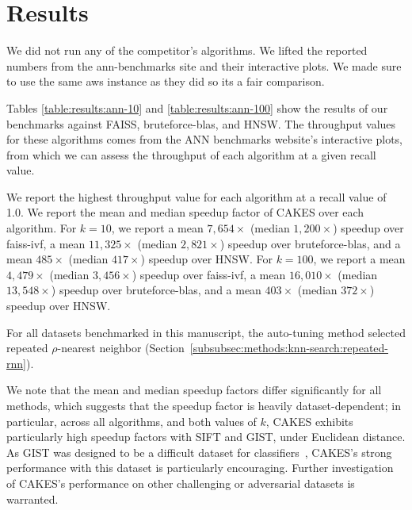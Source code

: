 \section{Results}
\label{sec:results}

We did not run any of the competitor's algorithms.
We lifted the reported numbers from the ann-benchmarks site and their interactive plots.
We made sure to use the same aws instance as they did so its a fair comparison.

Tables \ref{table:results:ann-10} and \ref{table:results:ann-100} show the results of our benchmarks against FAISS, bruteforce-blas, and HNSW.
The throughput values for these algorithms comes from the ANN benchmarks website's interactive plots, from which we can assess the throughput of each algorithm at a given recall value.

We report the highest throughput value for each algorithm at a recall value of 1.0.
We report the mean and median speedup factor of CAKES over each algorithm.
For $k= 10$, we report a mean $7,654 \times$ (median $1,200 \times$) speedup over faiss-ivf, a mean $11,325 \times$ (median $2,821 \times$) speedup over bruteforce-blas, and a mean $485 \times$ (median $417 \times$) speedup over HNSW. 
For $k=100$, we report a mean $4,479 \times$ (median $3,456 \times$) speedup over faiss-ivf, a mean $16,010 \times$ (median $13,548 \times$) speedup over bruteforce-blas, and a mean $403 \times$ (median $372 \times$) speedup over HNSW.

For all datasets benchmarked in this manuscript, the auto-tuning method selected repeated $\rho$-nearest neighbor (Section~\ref{subsubsec:methods:knn-search:repeated-rnn}).

We note that the mean and median speedup factors differ significantly for all methods, which suggests that the speedup factor is heavily dataset-dependent;
in particular, across all algorithms, and both values of $k$, CAKES exhibits particularly high speedup factors with SIFT and GIST, under Euclidean distance.
As GIST was designed to be a difficult dataset for classifiers~\cite{Lee2019PracticalLP}, CAKES's strong performance with this dataset is particularly encouraging.
Further investigation of CAKES's performance on other challenging or adversarial datasets is warranted. 

